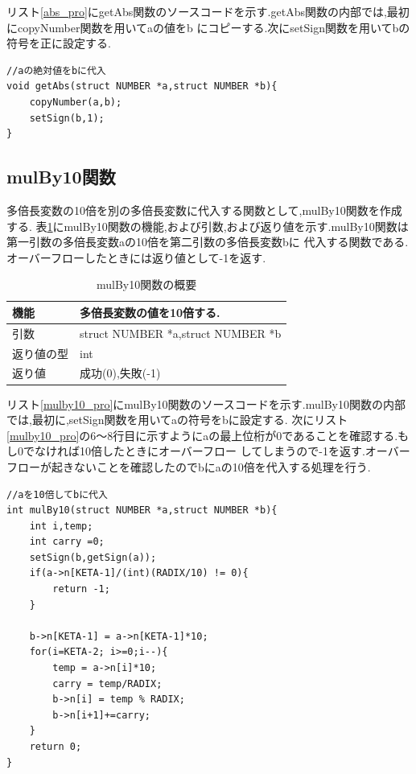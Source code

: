 \documentclass[a4j] {jarticle}
\begin{document}
  リスト\ref{abs_pro}にgetAbs関数のソースコードを示す.getAbs関数の内部では,最初にcopyNumber関数を用いてaの値をb
  にコピーする.次にsetSign関数を用いてbの符号を正に設定する.
  \begin{lstlisting}[basicstyle=\ttfamily\footnotesize, frame=single,label=abs_pro,caption=getAbs関数のソースコード]
//aの絶対値をbに代入
void getAbs(struct NUMBER *a,struct NUMBER *b){
    copyNumber(a,b);
    setSign(b,1);
}
  \end{lstlisting}

\subsection{mulBy10関数}
多倍長変数の10倍を別の多倍長変数に代入する関数として,mulBy10関数を作成する.
表\ref{mulBy10}にmulBy10関数の機能,および引数,および返り値を示す.mulBy10関数は第一引数の多倍長変数aの10倍を第二引数の多倍長変数bに
代入する関数である.オーバーフローしたときには返り値として-1を返す.
\begin{table}[H]
  \caption{mulBy10関数の概要}
  \label{mulBy10}
  \begin{center}
      \begin{tabular}{|l|l|}\hline
      機能 & 多倍長変数の値を10倍する.\\ \hline
      引数 & struct NUMBER *a,struct NUMBER *b\\ \hline
      返り値の型 & int\\ \hline
      返り値 & 成功(0),失敗(-1)\\ \hline
      \end{tabular}
  \end{center}
  \end{table}

  リスト\ref{mulby10_pro}にmulBy10関数のソースコードを示す.mulBy10関数の内部では,最初に,setSign関数を用いてaの符号をbに設定する.
  次にリスト\ref{mulby10_pro}の6～8行目に示すようにaの最上位桁が0であることを確認する.もし0でなければ10倍したときにオーバーフロー
  してしまうので-1を返す.オーバーフローが起きないことを確認したのでbにaの10倍を代入する処理を行う.
  \begin{lstlisting}[basicstyle=\ttfamily\footnotesize, frame=single,label=mulby10_pro,caption=mulBy10関数のソースコード]
//aを10倍してbに代入
int mulBy10(struct NUMBER *a,struct NUMBER *b){
    int i,temp;
    int carry =0;
    setSign(b,getSign(a));
    if(a->n[KETA-1]/(int)(RADIX/10) != 0){
        return -1;
    }

    b->n[KETA-1] = a->n[KETA-1]*10;
    for(i=KETA-2; i>=0;i--){
        temp = a->n[i]*10;
        carry = temp/RADIX;
        b->n[i] = temp % RADIX;
        b->n[i+1]+=carry;
    }
    return 0;
}
  \end{lstlisting}
\end{document}
